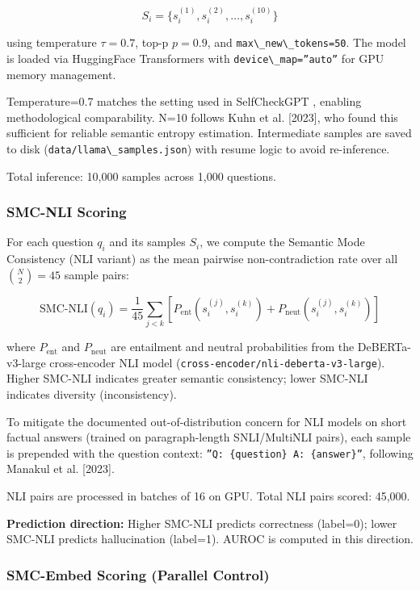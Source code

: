 $$S_i = \{s_i^{(1)}, s_i^{(2)}, \ldots, s_i^{(10)}\}$$

using temperature $\tau = 0.7$, top-p $p = 0.9$, and \texttt{max\textbackslash \_new\textbackslash \_tokens=50}. The model is loaded via HuggingFace Transformers with \texttt{device\textbackslash \_map=''auto''} for GPU memory management.

Temperature=0.7 matches the setting used in SelfCheckGPT \citep{Manakul2023SelfCheckGPT}, enabling methodological comparability. N=10 follows Kuhn et al. [2023], who found this sufficient for reliable semantic entropy estimation. Intermediate samples are saved to disk (\texttt{data/llama\textbackslash \_samples.json}) with resume logic to avoid re-inference.

Total inference: 10,000 samples across 1,000 questions.

\subsubsection{SMC-NLI Scoring}

For each question $q_i$ and its samples $S_i$, we compute the Semantic Mode Consistency (NLI variant) as the mean pairwise non-contradiction rate over all $\binom{N}{2} = 45$ sample pairs:

$$\text{SMC-NLI}(q_i) = \frac{1}{45} \sum_{j < k} \left[ P_\text{ent}(s_i^{(j)}, s_i^{(k)}) + P_\text{neut}(s_i^{(j)}, s_i^{(k)}) \right]$$

where $P_\text{ent}$ and $P_\text{neut}$ are entailment and neutral probabilities from the DeBERTa-v3-large cross-encoder NLI model (\texttt{cross-encoder/nli-deberta-v3-large}). Higher SMC-NLI indicates greater semantic consistency; lower SMC-NLI indicates diversity (inconsistency).

To mitigate the documented out-of-distribution concern for NLI models on short factual answers (trained on paragraph-length SNLI/MultiNLI pairs), each sample is prepended with the question context: \texttt{''Q: \{question\} A: \{answer\}''}, following Manakul et al. [2023].

NLI pairs are processed in batches of 16 on GPU. Total NLI pairs scored: 45,000.

\textbf{Prediction direction:} Higher SMC-NLI predicts correctness (label=0); lower SMC-NLI predicts hallucination (label=1). AUROC is computed in this direction.

\subsubsection{SMC-Embed Scoring (Parallel Control)}

